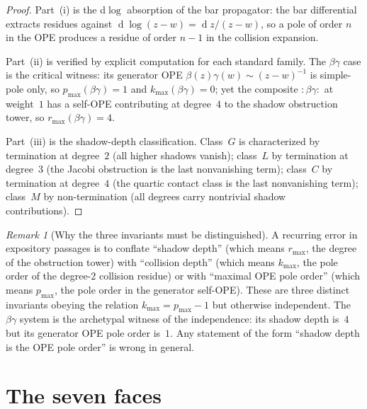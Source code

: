 \documentclass[11pt]{article}
\theoremstyle{plain}
\theoremstyle{definition}
\theoremstyle{remark}
\newtheorem{remark}[theorem]{Remark}
\begin{document}
\begin{proof}
Part~(i) is the d$\log$ absorption of the bar propagator: the bar
differential extracts residues against $\operatorname{d}\log(z-w)
= \operatorname{d}z/(z-w)$, so a pole of order $n$ in the OPE
produces a residue of order $n-1$ in the collision expansion.

Part~(ii) is verified by explicit computation for each standard
family. The $\beta\gamma$ case is the critical witness: its
generator OPE $\beta(z)\gamma(w)\sim (z-w)^{-1}$ is simple-pole
only, so $p_{\max}(\beta\gamma)=1$ and $k_{\max}(\beta\gamma)=0$;
yet the composite $:\!\beta\gamma\!:$ at weight~$1$ has a
self-OPE contributing at degree~$4$ to the shadow obstruction tower,
so $r_{\max}(\beta\gamma)=4$.

Part~(iii) is the shadow-depth classification. Class~$G$ is
characterized by termination at degree~$2$ (all higher shadows
vanish); class~$L$ by termination at degree~$3$ (the Jacobi
obstruction is the last nonvanishing term); class~$C$ by
termination at degree~$4$ (the quartic contact class is the last
nonvanishing term); class~$M$ by non-termination (all degrees
carry nontrivial shadow contributions).
\end{proof}

\begin{remark}[Why the three invariants must be distinguished]
\label{rem:three-invariants-depth-gap}
A recurring error in expository passages is to conflate ``shadow
depth'' (which means $r_{\max}$, the degree of the obstruction
tower) with ``collision depth'' (which means $k_{\max}$, the pole
order of the degree-$2$ collision residue) or with ``maximal OPE
pole order'' (which means $p_{\max}$, the pole order in the
generator self-OPE). These are three distinct invariants obeying
the relation $k_{\max}=p_{\max}-1$ but otherwise independent. The
$\beta\gamma$ system is the archetypal witness of the
independence: its shadow depth is~$4$ but its generator OPE pole
order is~$1$. Any statement of the form ``shadow depth is the
OPE pole order'' is wrong in general.
\end{remark}


\section{The seven faces}\label{sec:seven-faces}
\end{document}

